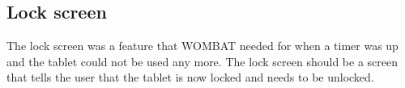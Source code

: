 \subsection{Lock screen}
\label{backlog:lock_screen}
The lock screen was a feature that WOMBAT needed for when a timer was up and the tablet could not be used any more. The lock screen should be a screen that tells the user that the tablet is now locked and needs to be unlocked.